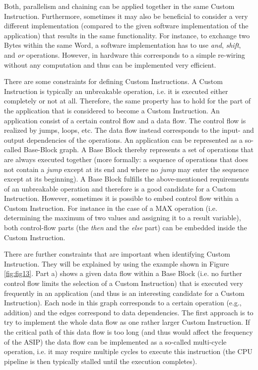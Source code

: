 Both, parallelism and chaining can be applied together in the same
Custom Instruction. Furthermore, sometimes it may also be beneficial to
consider a very different implementation (compared to the given software
implementation of the application) that results in the same
functionality. For instance, to exchange two Bytes within the same Word,
a software implementation has to use \emph{and}, \emph{shift}, and
\emph{or} operations. However, in hardware this corresponds to a simple
re-wiring without any computation and thus can be implemented very
efficient.

There are some constraints for defining Custom Instructions. A Custom
Instruction is typically an unbreakable operation, i.e. it is executed
either completely or not at all. Therefore, the same property has to
hold for the part of the application that is considered to become a
Custom Instruction. An application consist of a certain control flow and
a data flow. The control flow is realized by jumps, loops, etc. The data
flow instead corresponds to the input- and output dependencies of the
operations. An application can be represented as a so-called Base-Block
graph. A Base Block thereby represents a set of operations that are
always executed together (more formally: a sequence of operations that
does not contain a \emph{jump} except at its end and where no
\emph{jump} may enter the sequence except at its beginning). A Base
Block fulfills the above-mentioned requirements of an unbreakable
operation and therefore is a good candidate for a Custom Instruction.
However, sometimes it is possible to embed control flow within a Custom
Instruction. For instance in the case of a MAX operation (i.e.
determining the maximum of two values and assigning it to a result
variable), both control-flow parts (the \emph{then} and the \emph{else}
part) can be embedded inside the Custom Instruction.

There are further constraints that are important when identifying Custom
Instruction. They will be explained by using the example shown in Figure
\ref{fig:fig13}. Part a) shows a given data flow
within a Base Block (i.e. no further control flow limits the selection
of a Custom Instruction) that is executed very frequently in an
application (and thus is an interesting candidate for a Custom
Instruction). Each node in this graph corresponds to a certain operation
(e.g., addition) and the edges correspond to data dependencies. The
first approach is to try to implement the whole data flow as one rather
larger Custom Instruction. If the critical path of this data flow is too
long (and thus would affect the frequency of the ASIP) the data flow can
be implemented as a so-called multi-cycle operation, i.e. it may require
multiple cycles to execute this instruction (the CPU pipeline is then
typically stalled until the execution completes).

